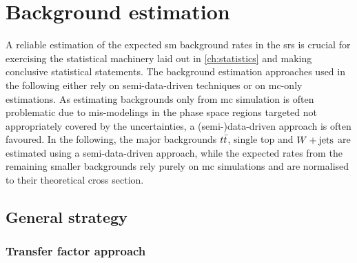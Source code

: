 

\chapter{Background estimation}

\ifpdf
    \graphicspath{{chapter-background/Figs/Raster/}{chapter-background/Figs/PDF/}{chapter-background/Figs/}}
\else
    \graphicspath{{chapter-background/Figs/Vector/}{chapter-background/Figs/}}
\fi


A reliable estimation of the expected \gls{sm} background rates in the \glspl{sr} is crucial for exercising the statistical machinery laid out in \cref{ch:statistics} and making conclusive statistical statements. The background estimation approaches used in the following either rely on semi-data-driven techniques or on \gls{mc}-only estimations. As estimating backgrounds only from \gls{mc} simulation is often problematic due to \eg mis-modelings in the phase space regions targeted not appropriately covered by the uncertainties, a (semi-)data-driven approach is often favoured. In the following, the major backgrounds $t\bar{t}$, single top and $W+\mathrm{jets}$ are estimated using a semi-data-driven approach, while the expected rates from the remaining smaller backgrounds rely purely on \gls{mc} simulations and are normalised to their theoretical cross section.

\section{General strategy}

\subsection{Transfer factor approach}

